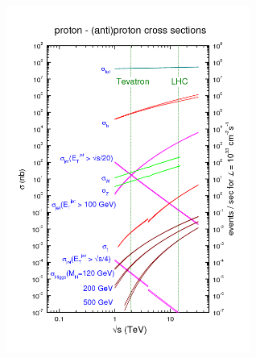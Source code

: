 \begin{minipagewithmarginpars}[ht!]{0.95\textwidth}
	\centering
	\includegraphics[width=0.60\textwidth]{LHC/crosssections2008.png}
	\captionsetup{type=figure}\caption{Sections efficaces du Modèle Standard pour les collisionneurs LHC et Tevatron en fonction de l'énergie dans le centre de masse $\sqrt{s}$. Les lignes pointillées indiquent les énergies dans le centre de masse associées au Tevatron (\SI{1.96}{\tera\eV}) et au LHC (\num{7}, \num{10} et \SI{14}{\tera\eV}). Les sections efficaces sont exprimées en nanobarn (gauche) et en Hertz (droite) pour une luminosité instantanée $\mathrm{L}=$\SI{e33}{\per\square\centi\meter\per\second}, luminosité typique des premières années de fonctionnement du LHC \cite{sectioneff}.}
	\label{crosssection}	
\end{minipagewithmarginpars}

